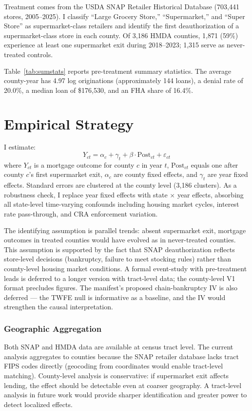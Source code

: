 \documentclass[12pt]{article}
\begin{document}
Treatment comes from the USDA SNAP Retailer Historical Database (703,441 stores, 2005--2025). I classify ``Large Grocery Store,'' ``Supermarket,'' and ``Super Store'' as supermarket-class retailers and identify the first deauthorization of a supermarket-class store in each county. Of 3,186 HMDA counties, 1,871 (59\%) experience at least one supermarket exit during 2018--2023; 1,315 serve as never-treated controls.



Table~\ref{tab:sumstats} reports pre-treatment summary statistics. The average county-year has 4.97 log originations (approximately 144 loans), a denial rate of 20.0\%, a median loan of \$176,530, and an FHA share of 16.4\%.

\section{Empirical Strategy}

I estimate:
\begin{equation}
Y_{ct} = \alpha_c + \gamma_t + \beta \cdot \text{Post}_{ct} + \varepsilon_{ct}
\end{equation}
where $Y_{ct}$ is a mortgage outcome for county $c$ in year $t$, $\text{Post}_{ct}$ equals one after county $c$'s first supermarket exit, $\alpha_c$ are county fixed effects, and $\gamma_t$ are year fixed effects. Standard errors are clustered at the county level (3,186 clusters). As a robustness check, I replace year fixed effects with state $\times$ year effects, absorbing all state-level time-varying confounds including housing market cycles, interest rate pass-through, and CRA enforcement variation.

The identifying assumption is parallel trends: absent supermarket exit, mortgage outcomes in treated counties would have evolved as in never-treated counties. This assumption is supported by the fact that SNAP deauthorization reflects store-level decisions (bankruptcy, failure to meet stocking rules) rather than county-level housing market conditions. A formal event-study with pre-treatment leads is deferred to a longer version with tract-level data; the county-level V1 format precludes figures. The manifest's proposed chain-bankruptcy IV is also deferred --- the TWFE null is informative as a baseline, and the IV would strengthen the causal interpretation.

\subsubsection*{Geographic Aggregation} Both SNAP and HMDA data are available at census tract level. The current analysis aggregates to counties because the SNAP retailer database lacks tract FIPS codes directly (geocoding from coordinates would enable tract-level matching). County-level analysis is conservative: if supermarket exit affects lending, the effect should be detectable even at coarser geography. A tract-level analysis in future work would provide sharper identification and greater power to detect localized effects.
\end{document}
